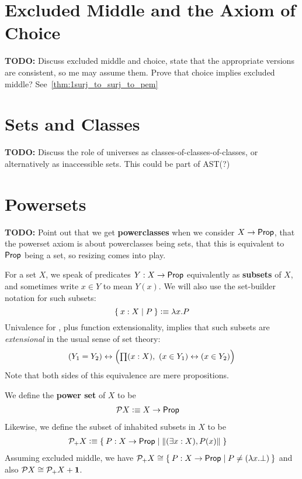 \section{Excluded Middle and the Axiom of Choice}
\label{sec:excl-middle-axiom}

\textbf{TODO:} Discuss excluded middle and choice, state that the appropriate versions are
consistent, so me may assume them. Prove that choice implies excluded middle?
See~\ref{thm:1surj_to_surj_to_pem}

\section{Sets and Classes}
\label{sec:sets-classes}

\textbf{TODO:} Discuss the role of universes as classes-of-classes-of-classes, or
alternatively as inaccessible sets.
This could be part of AST(?)

\section{Powersets}
\label{sec:powersets}

\textbf{TODO:} Point out that we get \textbf{powerclasses} when we consider $X \to \mathsf{Prop}$, that the
powerset axiom is about powerclasses being sets, that this is equivalent to $\mathsf{Prop}$ being
a set, so resizing comes into play.

For a set $X$, we speak of predicates $Y:X\to \mathsf{Prop}$ equivalently as \textbf{subsets} of $X$, and sometimes write $x\in Y$ to mean $Y(x)$.
We will also use the set-builder notation for such subsets:
\[ \Set{x:X | P } \vcentcolon\equiv \lambda x.P \]
Univalence for \prop, plus function extensionality, implies that such subsets are \emph{extensional} in the usual sense of set theory:
\[ (Y_1 = Y_2) \leftrightarrow \Big(\prd{x:X} (x\in Y_1) \leftrightarrow (x\in Y_2)\Big) \]
Note that both sides of this equivalence are mere propositions.

We define the \textbf{power set} of $X$ to be
\begin{align*}
  \mathcal{P} X &\vcentcolon\equiv X\to \mathsf{Prop}
\end{align*}
Likewise, we define the subset of inhabited subsets in $X$ to be
\begin{align*}
  \mathcal{P}_+ X &\defeq \setof{P:X\to \prop | \brck{(\exists x:X), P(x)}}
\end{align*}
Assuming excluded middle, we have $\mathcal{P}_+ X \cong \setof{P:X\to \prop | P \neq (\lambda x.\bot)}$ and also $\mathcal{P} X \cong \mathcal{P}_+ X + \mathbf{1}$.

